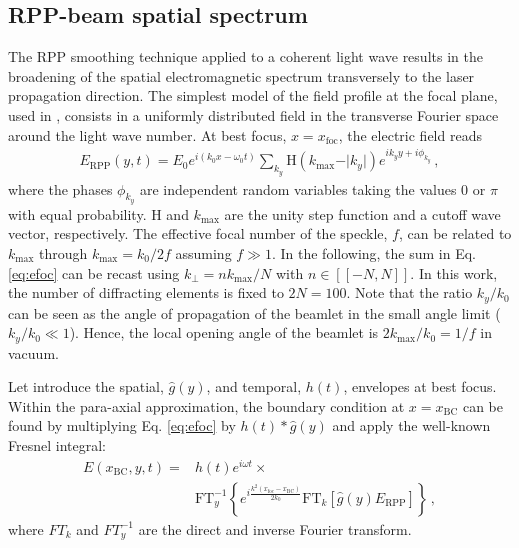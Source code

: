 \documentclass[%
 reprint,
 amsmath,amssymb,
 aps,
]{revtex4-1}
\begin{document}
\subsection{RPP-beam spatial spectrum}
The RPP smoothing technique applied to a coherent light wave results in the broadening of the spatial electromagnetic spectrum transversely to the laser propagation direction. 
The simplest model of the field profile at the focal plane, used in \cite[]{POF_Schmitt_88,POF_Rose_93}, consists in a uniformly distributed field in the transverse Fourier space around the light wave number. At best focus, $x=x_\mathrm{foc}$, the electric field reads
\begin{align}
    E_\mathrm{RPP}(y,t) =E_0 e^{i (k_0 x -\omega_0 t ) }   \sum_{k_y} \mathrm{H}( k_\mathrm{max} - \vert k_y \vert )e^{i k_y y +i\phi_{k_y}  }  \, , \label{eq:efoc}
\end{align}
where the phases $\phi_{k_y}$  are independent random variables taking the values $0$ or $\pi$ with equal probability. $\mathrm{H}$ and  $k_\mathrm{max}$ are the unity step function and a cutoff wave vector, respectively. The effective focal number of the speckle, $f$, can be related to  $k_\mathrm{max}$ through  $k_\mathrm{max}=k_0/2f$ assuming $f\gg 1$.
In the following, the sum in Eq. \eqref{eq:efoc} can be recast using $k_\perp =  n k_\mathrm{max}/N$ with $n\in[\![-N,N]\!]$. In this work, the number of diffracting elements is fixed to $2N=100$.
Note that the ratio $k_y/k_0$ can be seen as the angle of propagation of the beamlet in the small angle limit ($k_y/k_0\ll1$). Hence,   the local opening angle of the beamlet is $2k_\mathrm{max}/k_0 = 1/f$ in vacuum.
%

Let introduce the spatial, $\hat{g}(y)$, and temporal, $h(t)$, envelopes at best focus. Within the para-axial approximation, the boundary condition at $x=x_\mathrm{BC}$ can be found by multiplying Eq. \eqref{eq:efoc} by $h(t)*\hat{g}(y)$  and  apply the well-known Fresnel integral:
\begin{align}
    E(x_\mathrm{BC},y,t) =&h(t)e^{i\omega t}\times  \nonumber \\
    &\mathrm{FT}^{-1}_y \left\{ e^{i \frac{k^2 (x_\mathrm{foc}-x_\mathrm{BC}) }{2k_0}} 
   \mathrm{FT}_k \left[ \hat{g}(y)E_\mathrm{RPP} \right]  \right\}  \, , \label{eq:ebc}
\end{align}
where $FT_k$ and $FT^{-1}_y$ are the direct and inverse Fourier transform. 
\end{document}
